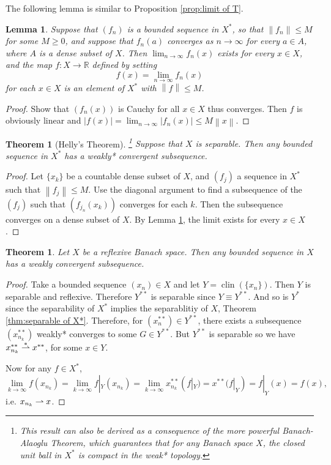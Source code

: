 \documentclass[12pt,a4paper]{report}
\numberwithin{equation}{section}
\theoremstyle{mystyle}
\newtheorem{theorem}[definition]{Theorem}
\newtheorem{lemma}[definition]{Lemma}
\newcommand{\R}{\mathbb{R}}
\newcommand{\norm}[1]{\left\lVert #1 \right\rVert}
\newcommand{\clin}{\operatorname{clin}}
\begin{document}
	The following lemma is similar to Proposition \ref{prop:limit of T}.
	\begin{lemma}\label{lem:dense converges}
		Suppose that $(f_n)$ is a bounded sequence in $X^*$, so that $\norm{f_n}\leq M$ for some $M\geq 0$, and suppose that $f_n(a)$ converges as $n\to\infty$ for every $a\in A$, where $A$ is a dense subset of $X$. Then $\lim_{n\to\infty}f_n(x)$ exists for every $x\in X$, and the map $f:X\to\R$ defined by setting
		$$
		f(x)=\lim_{n\to\infty}f_n(x)
		$$
		for each $x\in X$ is an element of $X^*$ with $\norm{f}\leq M$.
	\end{lemma}
	\begin{proof}
		Show that $(f_n(x))$ is Cauchy for all $x\in X$ thus converges. Then $f$ is obviously linear and $|f(x)|=\lim_{n\to\infty}|f_n(x)|\leq M\norm{x}$.
	\end{proof}

	\begin{theorem}[Helly's Theorem]
		\footnote{This result can also be derived as a consequence of the more powerful Banach-Alaoglu Theorem, which guarantees that for any Banach space $X$, the closed unit ball in $X^*$ is compact in the weak* topology.}
		Suppose that $X$ is separable. Then any bounded sequence in $X^*$ has a weakly* convergent subsequence.
	\end{theorem}
	\begin{proof}
		Let $\{x_k\}$ be a countable dense subset of $X$, and $(f_j)$ a sequence in $X^*$ such that $\norm{f_j}\leq M$. Use the diagonal argument to find a subsequence of the $(f_j)$ such that $(f_{j_n}(x_k))$ converges for each $k$. Then the subsequence converges on a dense subset of $X$. By Lemma \ref{lem:dense converges}, the limit exists for every $x\in X$.
	\end{proof}

	\begin{theorem}
		Let $X$ be a reflexive Banach space. Then any bounded sequence in $X$ has a weakly convergent subsequence.
	\end{theorem}
	\begin{proof}
		Take a bounded sequence $(x_n)\in X$ and let $Y=\clin(\{x_n\})$. Then $Y$ is separable and reflexive. Therefore $Y^{**}$ is separable since $Y\equiv Y^{**}$. And so is $Y^*$ since the separability of $X^*$ implies the separablitiy of $X$, Theorem \ref{thm:separable of X*}. Therefore, for $(x_n^{**}) \in Y^{**}$, there exists a subsequence $(x_{n_k}^{**})$ weakly* converges to some $G\in Y^{**}$. But $Y^{**}$ is separable so we have $x_{n_k}^{**}\overset{\ast}{\rightharpoonup} x^{**}$, for some $x\in Y$.
		
		Now for any $f\in X^*$,
		$$
		\lim_{k\to\infty}f(x_{n_k})=\lim_{k\to\infty} f|_Y (x_{n_k})=\lim_{k\to\infty} x_{n_k}^{**}(f|_Y)=x^{**}(f|_Y)=f|_Y(x)=f(x),
		$$
		i.e. $x_{n_k}\rightharpoonup x$.
	\end{proof}
\end{document}
